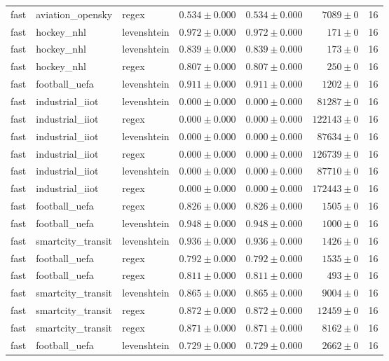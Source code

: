\begin{table}[htbp]
\begin{tabular}{l l l r r r r}
fast & aviation\_opensky & regex & $0.534\pm0.000$ & $0.534\pm0.000$ & $7089\pm0$ & 16 \\
fast & hockey\_nhl & levenshtein & $0.972\pm0.000$ & $0.972\pm0.000$ & $171\pm0$ & 16 \\
fast & hockey\_nhl & levenshtein & $0.839\pm0.000$ & $0.839\pm0.000$ & $173\pm0$ & 16 \\
fast & hockey\_nhl & regex & $0.807\pm0.000$ & $0.807\pm0.000$ & $250\pm0$ & 16 \\
fast & football\_uefa & levenshtein & $0.911\pm0.000$ & $0.911\pm0.000$ & $1202\pm0$ & 16 \\
fast & industrial\_iiot & levenshtein & $0.000\pm0.000$ & $0.000\pm0.000$ & $81287\pm0$ & 16 \\
fast & industrial\_iiot & regex & $0.000\pm0.000$ & $0.000\pm0.000$ & $122143\pm0$ & 16 \\
fast & industrial\_iiot & levenshtein & $0.000\pm0.000$ & $0.000\pm0.000$ & $87634\pm0$ & 16 \\
fast & industrial\_iiot & regex & $0.000\pm0.000$ & $0.000\pm0.000$ & $126739\pm0$ & 16 \\
fast & industrial\_iiot & levenshtein & $0.000\pm0.000$ & $0.000\pm0.000$ & $87710\pm0$ & 16 \\
fast & industrial\_iiot & regex & $0.000\pm0.000$ & $0.000\pm0.000$ & $172443\pm0$ & 16 \\
fast & football\_uefa & regex & $0.826\pm0.000$ & $0.826\pm0.000$ & $1505\pm0$ & 16 \\
fast & football\_uefa & levenshtein & $0.948\pm0.000$ & $0.948\pm0.000$ & $1000\pm0$ & 16 \\
fast & smartcity\_transit & levenshtein & $0.936\pm0.000$ & $0.936\pm0.000$ & $1426\pm0$ & 16 \\
fast & football\_uefa & regex & $0.792\pm0.000$ & $0.792\pm0.000$ & $1535\pm0$ & 16 \\
fast & football\_uefa & regex & $0.811\pm0.000$ & $0.811\pm0.000$ & $493\pm0$ & 16 \\
fast & smartcity\_transit & levenshtein & $0.865\pm0.000$ & $0.865\pm0.000$ & $9004\pm0$ & 16 \\
fast & smartcity\_transit & regex & $0.872\pm0.000$ & $0.872\pm0.000$ & $12459\pm0$ & 16 \\
fast & smartcity\_transit & regex & $0.871\pm0.000$ & $0.871\pm0.000$ & $8162\pm0$ & 16 \\
fast & football\_uefa & levenshtein & $0.729\pm0.000$ & $0.729\pm0.000$ & $2662\pm0$ & 16 \\

\end{tabular}
\end{table}
